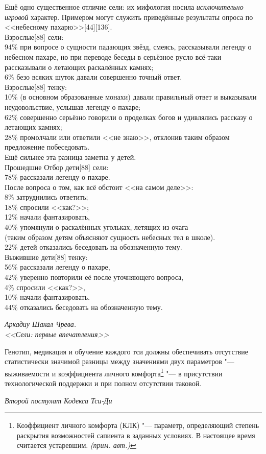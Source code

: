 \documentclass[a4paper,10pt,fleqn]{book}
\newcommand{\authornote}{\textit{(прим. авт.)}}
\begin{document}
\epigraph{Ещё одно существенное отличие сели: их мифология носила \textit{исключительно игровой} характер.
Примером могут служить приведённые результаты опроса по <<небесному пахарю>>[44][136].\\
Взрослые[88] сели:\\
94\% при вопросе о сущности падающих звёзд, смеясь, рассказывали легенду о небесном пахаре, но при переводе беседы в серьёзное русло всё-таки рассказывали о летающих раскалённых камнях;\\
6\% безо всяких шуток давали совершенно точный ответ.\\
Взрослые[88] тенку:\\
10\% (в основном образованные монахи) давали правильный ответ и выказывали неудовольствие, услышав легенду о пахаре;\\
62\% совершенно серьёзно говорили о проделках богов и удивлялись рассказу о летающих камнях;\\
28\% промолчали или ответили <<не знаю>>, отклонив таким образом предложение побеседовать.\\
Ещё сильнее эта разница заметна у детей.\\
Прошедшие Отбор дети[88] сели:\\
78\% рассказали легенду о пахаре.\\
После вопроса о том, как всё обстоит <<на самом деле>>:\\
8\% затруднились ответить;\\
18\% спросили <<как?>>;\\
12\% начали фантазировать,\\
40\% упомянули о раскалённых угольках, летящих из очага\\
(таким образом детям объясняют сущность небесных тел в школе).\\
22\% детей отказались беседовать на обозначенную тему.\\
Выжившие дети[88] тенку:\\
56\% рассказали легенду о пахаре,\\
42\% уверенно повторили её после уточняющего вопроса,\\
4\% спросили <<как?>>,\\
10\% начали фантазировать.\\
44\% отказались беседовать на обозначенную тему.}
{\textit{Аркадиу Шакал Чрева.\\<<Сели: первые впечатления>>}}

\epigraph{Генотип, медикация и обучение каждого тси должны обеспечивать отсутствие статистически значимой разницы между значениями двух параметров "--- выживаемости и коэффициента личного комфорта\footnote
{Коэффициент личного комфорта (КЛК) "--- параметр, определяющий степень раскрытия возможностей сапиента в заданных условиях.
В настоящее время считается устаревшим. \authornote}
"--- в присутствии технологической поддержки и при полном отсутствии таковой.}
{\textit{Второй постулат Кодекса Тси-Ди}}
\end{document}
